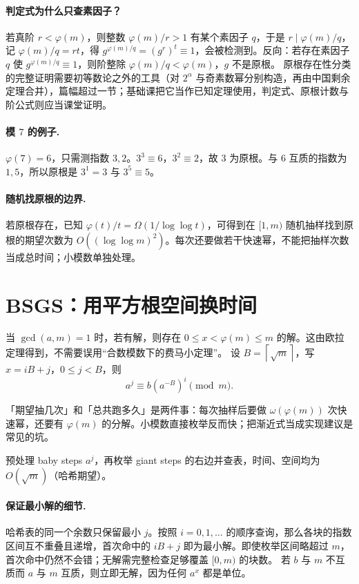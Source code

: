 \documentclass[UTF8,a4paper,11pt,twoside,openright,fontset=fandol]{ctexbook}
\theoremstyle{definition}
\newcommand{\ceil}[1]{\left\lceil #1\right\rceil}
\begin{document}
\paragraph{判定式为什么只查素因子？}
若真阶 $r<\varphi(m)$，则整数 $\varphi(m)/r>1$ 有某个素因子 $q$，于是 $r\mid\varphi(m)/q$，记 $\varphi(m)/q=rt$，得 $g^{\varphi(m)/q}=(g^r)^t\equiv1$，会被检测到。反向：若存在素因子 $q$ 使 $g^{\varphi(m)/q}\equiv1$，则阶整除 $\varphi(m)/q<\varphi(m)$，$g$ 不是原根。
原根存在性分类的完整证明需要初等数论之外的工具（对 $2^\alpha$ 与奇素数幂分别构造，再由中国剩余定理合并），篇幅超过一节；基础课把它当作已知定理使用，判定式、原根计数与阶公式则应当课堂证明。
\paragraph{模 $7$ 的例子.} $\varphi(7)=6$，只需测指数 $3,2$。$3^3\equiv6$，$3^2\equiv2$，故 $3$ 为原根。与 $6$ 互质的指数为 $1,5$，所以原根是 $3^1=3$ 与 $3^5\equiv5$。
\paragraph{随机找原根的边界.} 若原根存在，已知 $\varphi(t)/t=\Omega(1/\log\log t)$，可得到在 $[1,m)$ 随机抽样找到原根的期望次数为 $O((\log\log m)^2)$。每次还要做若干快速幂，不能把抽样次数当成总时间；小模数单独处理。


\section{BSGS：用平方根空间换时间}
当 $\gcd(a,m)=1$ 时，若有解，则存在 $0\le x<\varphi(m)\le m$ 的解。这由欧拉定理得到，不需要误用“合数模数下的费马小定理”。
设 $B=\ceil{\sqrt m}$，写 $x=iB+j$，$0\le j<B$，则
\[
 a^j\equiv b(a^{-B})^i\pmod m.
\]

\begin{tip}
「期望抽几次」和「总共跑多久」是两件事：每次抽样后要做 $\omega(\varphi(m))$ 次快速幂，还要有 $\varphi(m)$ 的分解。小模数直接枚举反而快；把渐近式当成实现建议是常见的坑。
\end{tip}

预处理 baby steps $a^j$，再枚举 giant steps 的右边并查表，时间、空间均为 $O(\sqrt m)$（哈希期望）。


\paragraph{保证最小解的细节.}
哈希表的同一个余数只保留最小 $j$。按照 $i=0,1,\ldots$ 的顺序查询，那么各块的指数区间互不重叠且递增，首次命中的 $iB+j$ 即为最小解。即使枚举区间略超过 $m$，首次命中仍然不会错；无解需完整检查足够覆盖 $[0,m)$ 的块数。
若 $b$ 与 $m$ 不互质而 $a$ 与 $m$ 互质，则立即无解，因为任何 $a^x$ 都是单位。
\end{document}
